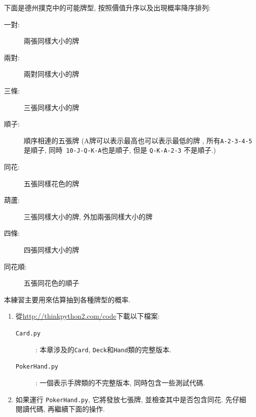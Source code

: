 \documentclass[10pt]{book}
\begin{document}
\begin{exercise}
\label{poker}
下面是德州撲克中的可能牌型, 按照價值升序以及出現概率降序排列:

\begin{description}

\item[一對:] 兩張同樣大小的牌
\vspace{-0.05in}

\item[兩對:] 兩對同樣大小的牌
\vspace{-0.05in}

\item[三條:] 三張同樣大小的牌
\vspace{-0.05in}

\item[順子:] 順序相連的五張牌 (A牌可以表示最高也可以表示最低的牌
, 所有{\tt A-2-3-4-5}是順子, 同時{\tt
10-J-Q-K-A}也是順子, 但是 {\tt Q-K-A-2-3} 不是順子.)
\vspace{-0.05in}

\item[同花:] 五張同樣花色的牌
\vspace{-0.05in}

\item[葫蘆:] 三張同樣大小的牌, 外加兩張同樣大小的牌
\vspace{-0.05in}

\item[四條:] 四張同樣大小的牌
\vspace{-0.05in}

\item[同花順:] 五張同花色的順子
\vspace{-0.05in}

\end{description}
%
本練習主要用來估算抽到各種牌型的概率.

\begin{enumerate}

\item 從\url{http://thinkpython2.com/code}下載以下檔案:

\begin{description}

\item[{\tt Card.py}]: 本章涉及的{\tt Card},
{\tt Deck}和{\tt Hand}類的完整版本. 

\item[{\tt PokerHand.py}]: 一個表示手牌類的不完整版本, 同時包含一些測試代碼.

\end{description}
%
\item 如果運行 {\tt PokerHand.py}, 它將發放七張牌, 
並檢查其中是否包含同花. 先仔細閱讀代碼, 再繼續下面的操作. 


\end{enumerate}
\end{exercise}
\end{document}
